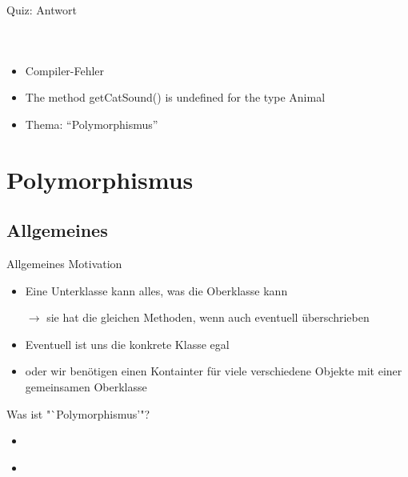 \documentclass[usepdftitle=false,hyperref={pdfpagelabels=false}]{beamer}
\begin{document}
\begin{frame}{Quiz: Antwort}
    \begin{minipage}[b]{0.45\linewidth}
        \inputminted[linenos=false, numbersep=5pt, tabsize=4, fontsize=\tiny, label=Animal.java, frame=lines]{java}{Animal.java}
        \vspace{1cm}
        \inputminted[linenos=false, numbersep=5pt, tabsize=4, fontsize=\tiny, label=Jungle.java, frame=lines]{java}{Jungle.java}
    \end{minipage}
    \hspace{0.5cm}
    \begin{minipage}[b]{0.45\linewidth}
        \inputminted[linenos=false, numbersep=5pt, tabsize=4, fontsize=\tiny, label=Cat.java, frame=lines]{java}{Cat.java}
        \begin{itemize}
            \item Compiler-Fehler
            \item The method getCatSound() is undefined for the type Animal
            \item Thema: "`Polymorphismus"'
        \end{itemize}
    \end{minipage}
\end{frame}

\section{Polymorphismus}
\subsection{Allgemeines}
\begin{frame}{Allgemeines}
    Motivation
    \begin{itemize}
        \item Eine Unterklasse kann alles, was die Oberklasse kann
        \item[$\rightarrow$] sie hat die gleichen Methoden, wenn auch eventuell überschrieben
        \item Eventuell ist uns die konkrete Klasse egal
        \item oder wir benötigen einen Kontainter für viele verschiedene
              Objekte mit einer gemeinsamen Oberklasse
    \end{itemize}

    Was ist "`Polymorphismus'"?
    \begin{itemize}
        \item {}
        \item {}\\
    \end{itemize}
\end{frame}
\end{document}

